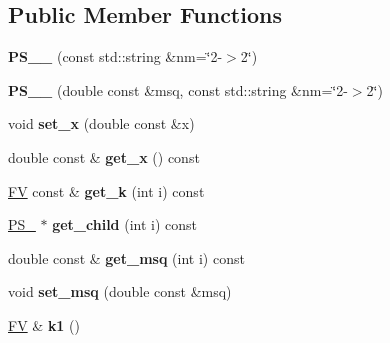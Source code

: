 \subsection*{Public Member Functions}
\begin{DoxyCompactItemize}
\item 
\hypertarget{classPS__2__1_abdf4e57ac00768c463aa0f25ca8eaa55}{}{\bfseries P\+S\+\_\+\_} (const std\+::string \&nm=\char`\"{}2-\/$>$2\char`\"{})\label{classPS__2__1_abdf4e57ac00768c463aa0f25ca8eaa55}

\item 
\hypertarget{classPS__2__1_a5f6b4ede135f7decfad67cafa2be6a1f}{}{\bfseries P\+S\+\_\+\_} (double const \&msq, const std\+::string \&nm=\char`\"{}2-\/$>$2\char`\"{})\label{classPS__2__1_a5f6b4ede135f7decfad67cafa2be6a1f}

\item 
\hypertarget{classPS__2__1_a85f554f63cdd77eb9e961f21dc8a5025}{}void {\bfseries set\+\_\+x} (double const \&x)\label{classPS__2__1_a85f554f63cdd77eb9e961f21dc8a5025}

\item 
\hypertarget{classPS__2__1_ae61b15b9a11d358ab1db760a68d29a48}{}double const \& {\bfseries get\+\_\+x} () const \label{classPS__2__1_ae61b15b9a11d358ab1db760a68d29a48}

\item 
\hypertarget{classPS__2__1_ad6834a4e1e1b0e7081020d9c93fce803}{}\hyperlink{classFV}{F\+V} const \& {\bfseries get\+\_\+k} (int i) const \label{classPS__2__1_ad6834a4e1e1b0e7081020d9c93fce803}

\item 
\hypertarget{classPS__2__1_ac47a7de9d93c165993b96aeb6d8b51a9}{}\hyperlink{classPS__2}{P\+S\+\_} $\ast$ {\bfseries get\+\_\+child} (int i) const \label{classPS__2__1_ac47a7de9d93c165993b96aeb6d8b51a9}

\item 
\hypertarget{classPS__2__1_ac1ebcf6777ab799e9c56f90ec6bd0d63}{}double const \& {\bfseries get\+\_\+msq} (int i) const \label{classPS__2__1_ac1ebcf6777ab799e9c56f90ec6bd0d63}

\item 
\hypertarget{classPS__2__1_ad3a493e3ccbb2b98c6e74131ba62d840}{}void {\bfseries set\+\_\+msq} (double const \&msq)\label{classPS__2__1_ad3a493e3ccbb2b98c6e74131ba62d840}

\item 
\hypertarget{classPS__2__1_a0c349c6d76745bf8c345b6193b4a382a}{}\hyperlink{classFV}{F\+V} \& {\bfseries k1} ()\label{classPS__2__1_a0c349c6d76745bf8c345b6193b4a382a}


\end{DoxyCompactItemize}
